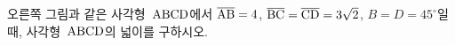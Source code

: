 \noindent\begin{minipage}[t]{0.58\linewidth}\vspace{0pt}\raggedright 오른쪽 그림과 같은 사각형~$\mathrm{ABCD}$에서 $\overline{\mathrm{AB}}=4$, $\overline{\mathrm{BC}}=\overline{\mathrm{CD}}=3\sqrt{2}$, $B=D=45^\circ$일 때, 사각형~$\mathrm{ABCD}$의 넓이를 구하시오. \end{minipage}\hfill\begin{minipage}[t]{0.4\linewidth}\vspace{0pt}\centering \resizebox{\ifdim\width>\linewidth\linewidth\else\width\fi}{!}{}\end{minipage}\par
